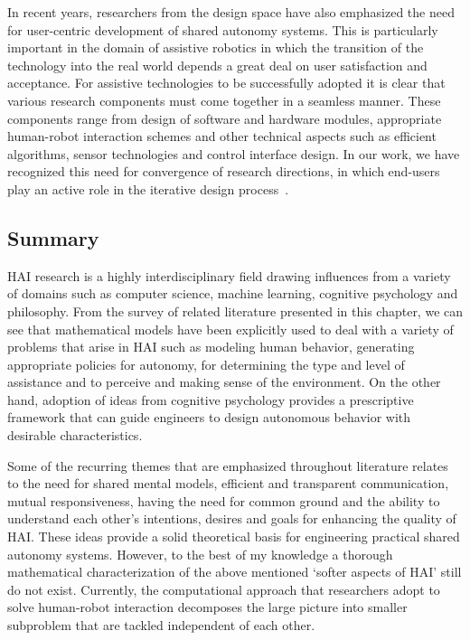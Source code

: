\documentclass[12pt]{article}
\begin{document}
In recent years, researchers from the design space have also emphasized the need for user-centric development of shared autonomy systems. This is particularly important in the domain of assistive robotics in which the transition of the technology into the real world depends a great deal on user satisfaction and acceptance. For assistive technologies to be successfully adopted it is clear that various research components must come together in a seamless manner. These components range from design of software and hardware modules, appropriate human-robot interaction schemes and other technical aspects such as efficient algorithms, sensor technologies and control interface design. In our work, we have recognized this need for convergence of research directions, in which end-users play an active role in the iterative design process~\cite{egli2016call}. 


\subsection{Summary}

HAI research is a highly interdisciplinary field drawing influences from a variety of domains such as computer science, machine learning, cognitive psychology and philosophy. From the survey of related literature presented in this chapter, we can see that mathematical models have been explicitly used to deal with a variety of problems that arise in HAI such as modeling human behavior, generating appropriate policies for autonomy, for determining the type and level of assistance and to perceive and making sense of the environment. On the other hand, adoption of ideas from cognitive psychology provides a prescriptive framework that can guide engineers to design autonomous behavior with desirable characteristics. 

Some of the recurring themes that are emphasized throughout literature relates to the need for shared mental models, efficient and transparent communication, mutual responsiveness, having the need for common ground and the ability to understand each other's intentions, desires and goals for enhancing the quality of HAI. These ideas provide a solid theoretical basis for engineering practical shared autonomy systems. However, to the best of my knowledge a thorough mathematical characterization of the above mentioned `softer aspects of HAI' still do not exist. Currently, the computational approach that researchers adopt to solve human-robot interaction decomposes the large picture into smaller subproblem that are tackled independent of each other. 
\end{document}
